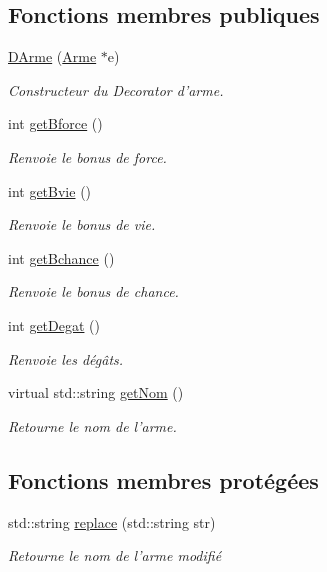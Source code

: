 \subsection*{Fonctions membres publiques}
\begin{DoxyCompactItemize}
\item 
\hypertarget{class_d_arme_adb0f0f90c314d30362d9a31a53173a70}{\hyperlink{class_d_arme_adb0f0f90c314d30362d9a31a53173a70}{D\-Arme} (\hyperlink{class_arme}{Arme} $\ast$e)}\label{class_d_arme_adb0f0f90c314d30362d9a31a53173a70}

\begin{DoxyCompactList}\small\item\em Constructeur du Decorator d'arme. \end{DoxyCompactList}\item 
int \hyperlink{class_d_arme_a76075bcbe61b20bd0e21e2d06fe33ab7}{get\-Bforce} ()
\begin{DoxyCompactList}\small\item\em Renvoie le bonus de force. \end{DoxyCompactList}\item 
int \hyperlink{class_d_arme_a91b3a3100969a568a8408ba098668398}{get\-Bvie} ()
\begin{DoxyCompactList}\small\item\em Renvoie le bonus de vie. \end{DoxyCompactList}\item 
int \hyperlink{class_d_arme_ad50d376b08d62276b7cf50d2cd59d619}{get\-Bchance} ()
\begin{DoxyCompactList}\small\item\em Renvoie le bonus de chance. \end{DoxyCompactList}\item 
int \hyperlink{class_d_arme_a7396e865674067f4f21a28e6babc0fad}{get\-Degat} ()
\begin{DoxyCompactList}\small\item\em Renvoie les dégâts. \end{DoxyCompactList}\item 
virtual std\-::string \hyperlink{class_arme_ab1b18cfa41fac19fccedf2165b9ff33c}{get\-Nom} ()
\begin{DoxyCompactList}\small\item\em Retourne le nom de l'arme. \end{DoxyCompactList}\end{DoxyCompactItemize}
\subsection*{Fonctions membres protégées}
\begin{DoxyCompactItemize}
\item 
std\-::string \hyperlink{class_d_arme_a604caa7ee656dab58d15b7cf86863e3d}{replace} (std\-::string str)
\begin{DoxyCompactList}\small\item\em Retourne le nom de l'arme modifié \end{DoxyCompactList}\end{DoxyCompactItemize}
